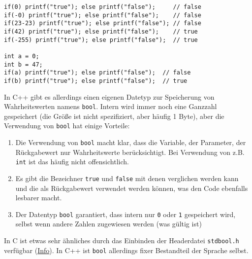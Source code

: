 \documentclass[11pt]{article}
\begin{document}
\begin{verbatim}
if(0) printf("true"); else printf("false");     // false
if(-0) printf("true"); else printf("false");    // false
if(23-23) printf("true"); else printf("false"); // false
if(42) printf("true"); else printf("false");    // true
if(-255) printf("true"); else printf("false");  // true

int a = 0;
int b = 47;
if(a) printf("true"); else printf("false");  // false
if(b) printf("true"); else printf("false");  // true
\end{verbatim}

In C++ gibt es allerdings einen eigenen Datetyp zur Speicherung von
Wahrheitswerten namens \verb~bool~. Intern wird immer noch eine Ganzzahl
gespeichert (die Größe ist nicht spezifiziert, aber häufig 1 Byte),
aber die Verwendung von \verb~bool~ hat einige Vorteile:

\begin{enumerate}
\item Die Verwendung von \verb~bool~ macht klar, dass die Variable, der
Parameter, der Rückgabewert nur Wahrheitswerte berücksichtigt. Bei
Verwendung von z.B. \verb~int~ ist das häufig nicht offensichtlich.
\item Es gibt die Bezeichner \verb~true~ und \verb~false~ mit denen verglichen
werden kann und die als Rückgabewert verwendet werden können, was
den Code ebenfalls lesbarer macht.
\item Der Datentyp \verb~bool~ garantiert, dass intern nur \verb~0~ oder \verb~1~
gespeichert wird, selbst wenn andere Zahlen zugewiesen werden (was
gültig ist)
\end{enumerate}

In C ist etwas sehr ähnliches durch das Einbinden der Headerdatei
\verb~stdbool.h~ verfügbar (\href{http://openbook.rheinwerk-verlag.de/c_von_a_bis_z/005_c_basisdatentypen_015.htm}{Info}). In C++ ist \verb~bool~ allerdings fixer
Bestandteil der Sprache selbst.
\end{document}
